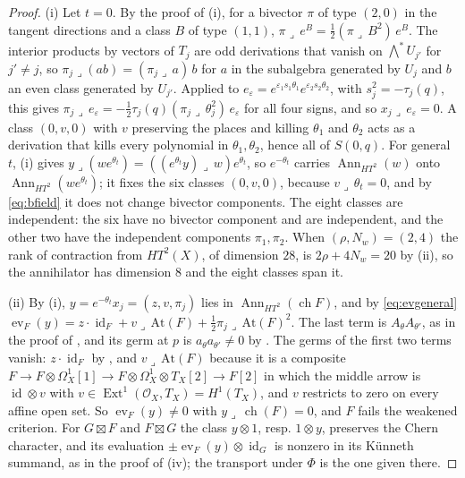 \documentclass[11pt,reqno]{amsart}
\theoremstyle{plain}
\theoremstyle{definition}
\theoremstyle{remark}
\newcommand{\cO}{\mathcal{O}}
\DeclareMathOperator{\ch}{ch}
\DeclareMathOperator{\Ext}{Ext}
\DeclareMathOperator{\id}{id}
\DeclareMathOperator{\Ann}{Ann}
\begin{document}
\begin{proof}
(i) Let $t=0$. By the proof of (i), for a bivector $\pi$
of type $(2,0)$ in the tangent directions and a class $B$ of type $(1,1)$,
$\pi\lrcorner\,e^{B}=\tfrac12(\pi\lrcorner\,B^{2})\,e^{B}$. The interior
products by vectors of $T_{j}$ are odd derivations that vanish on
$\bigwedge^{*}U_{j'}$ for $j'\ne j$, so $\pi_{j}\lrcorner(ab)=(\pi_{j}\lrcorner\,a)\,b$
for $a$ in the subalgebra generated by $U_{j}$ and $b$ an even class
generated by $U_{j'}$. Applied to
$e_{\varepsilon}=e^{\varepsilon_{1}s_{1}\theta_{1}}e^{\varepsilon_{2}s_{2}\theta_{2}}$,
with $s_{j}^{2}=-\tau_{j}(q)$, this gives
$\pi_{j}\lrcorner\,e_{\varepsilon}=-\tfrac12\tau_{j}(q)(\pi_{j}\lrcorner\,\theta_{j}^{2})\,e_{\varepsilon}$
for all four signs, and so $x_{j}\lrcorner\,e_{\varepsilon}=0$. A class
$(0,v,0)$ with $v$ preserving the places and killing $\theta_{1}$ and
$\theta_{2}$ acts as a derivation that kills every polynomial in
$\theta_{1},\theta_{2}$, hence all of $S(0,q)$. For general $t$,
(i) gives $y\lrcorner(we^{\theta_{t}})=((e^{\theta_{t}}y)\lrcorner\,w)e^{\theta_{t}}$,
so $e^{-\theta_{t}}$ carries $\Ann_{HT^{2}}(w)$ onto
$\Ann_{HT^{2}}(we^{\theta_{t}})$; it fixes the six classes $(0,v,0)$,
because $v\lrcorner\,\theta_{t}=0$, and by \eqref{eq:bfield} it does not
change bivector components. The eight classes are independent: the six have
no bivector component and are independent, and the other two have the
independent components $\pi_{1},\pi_{2}$. When $(\rho,N_{w})=(2,4)$ the rank
of contraction from $HT^{2}(X)$, of dimension $28$, is $2\rho+4N_{w}=20$ by
(ii), so the annihilator has dimension $8$ and the
eight classes span it.

(ii) By (i), $y=e^{-\theta_{t}}x_{j}=(z,v,\pi_{j})$ lies in
$\Ann_{HT^{2}}(\ch F)$, and by \eqref{eq:evgeneral}
$\operatorname{ev}_{F}(y)=z\cdot\id_{F}+v\lrcorner\,\mathrm{At}(F)
+\tfrac12\pi_{j}\lrcorner\,\mathrm{At}(F)^{2}$. The last term is
$A_{\theta}A_{\theta'}$, as in the proof of , and its
germ at $p$ is $a_{\theta}a_{\theta'}\ne0$ by . The germs of the
first two terms vanish: $z\cdot\id_{F}$ by , and
$v\lrcorner\,\mathrm{At}(F)$ because it is a composite
$F\to F\otimes\Omega^{1}_{X}[1]\to F\otimes\Omega^{1}_{X}\otimes T_{X}[2]\to F[2]$
in which the middle arrow is $\id\otimes v$ with
$v\in\Ext^{1}(\cO_{X},T_{X})=H^{1}(T_{X})$, and $v$ restricts to zero on
every affine open set. So $\operatorname{ev}_{F}(y)\ne0$ with
$y\lrcorner\,\ch(F)=0$, and $F$ fails the weakened criterion. For
$G\boxtimes F$ and $F\boxtimes G$ the class $y\otimes1$, resp. $1\otimes y$,
preserves the Chern character, and its evaluation
$\pm\operatorname{ev}_{F}(y)\otimes\id_{G}$ is nonzero in its K\"unneth
summand, as in the proof of (iv); the transport under
$\Phi$ is the one given there.


\end{proof}
\end{document}
